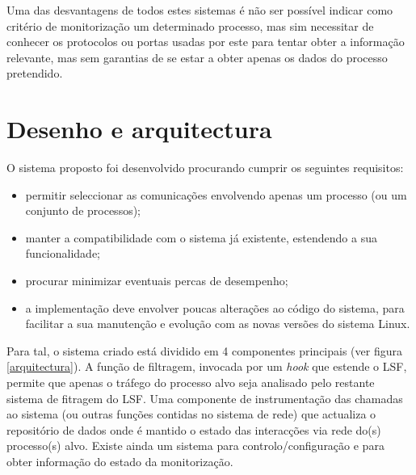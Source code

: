 \documentclass[a4paper]{llncs}
\begin{document}
Uma das desvantagens de todos estes sistemas é não ser possível indicar como critério de monitorização um determinado processo, mas sim necessitar de conhecer os protocolos ou portas usadas por este para tentar obter a informação relevante, mas sem garantias de se estar a obter apenas os dados do processo pretendido.


\section{Desenho e arquitectura}
\label{sec:architecture}

O sistema proposto foi desenvolvido procurando cumprir os seguintes requisitos:
\begin{itemize}
\item permitir seleccionar as comunicações envolvendo apenas um processo (ou um conjunto de processos);
\item manter a compatibilidade com o sistema já existente, estendendo a sua funcionalidade;
\item procurar minimizar eventuais percas de desempenho;
\item a implementação deve envolver poucas alterações ao código do sistema, para facilitar a sua manutenção e evolução com as novas versões do sistema Linux.
\end{itemize}

Para tal, o sistema criado está dividido em 4 componentes principais (ver figura \ref{arquitectura}). A função de filtragem, invocada por um \textit{hook} que estende o LSF, permite que apenas o tráfego do processo alvo seja analisado pelo restante sistema de fitragem do LSF. Uma componente de instrumentação das chamadas ao sistema (ou outras funções contidas no sistema de rede) que actualiza o repositório de dados onde é mantido o estado das interacções via rede do(s) processo(s) alvo. Existe ainda um sistema para controlo/configuração e para obter informação do estado da monitorização.
\end{document}
